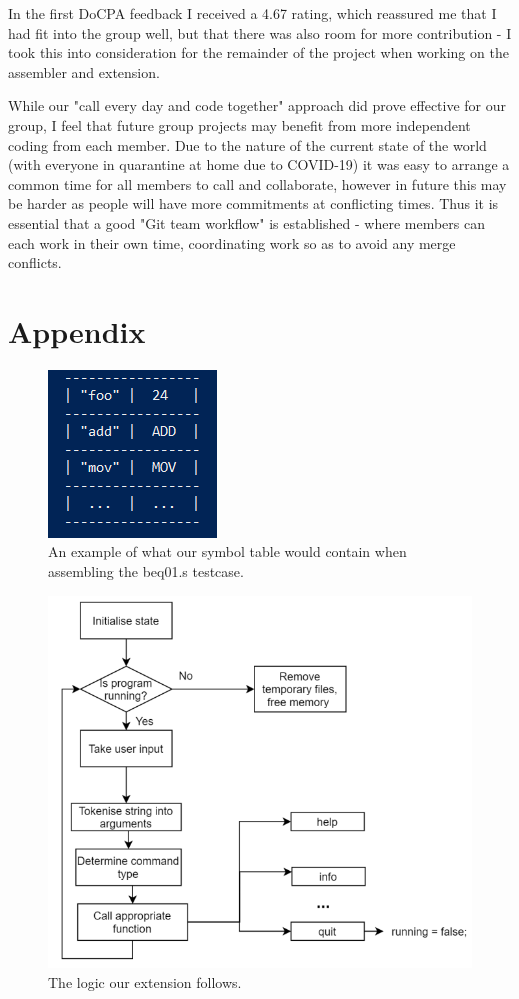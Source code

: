\documentclass[11pt]{article}
\begin{document}
In the first DoCPA feedback I received a 4.67 rating, which reassured me that I had fit into the group well, but that there was also room for more contribution - I took this into consideration for the remainder of the project when working on the assembler and extension. 

While our "call every day and code together" approach did prove effective for our group, I feel that future group projects may benefit from more independent coding from each member. Due to the nature of the current state of the world (with everyone in quarantine at home due to COVID-19) it was easy to arrange a common time for all members to call and collaborate, however in future this may be harder as people will have more commitments at conflicting times. Thus it is essential that a good "Git team workflow" is established - where members can each work in their own time, coordinating work so as to avoid any merge conflicts.
\newpage
\appendix
\section*{Appendix}

\begin{figure}[ht]
    \centering
    \includegraphics[scale = 0.9]{symbolTable.png}
    \caption{An example of what our symbol table would contain when assembling the beq01.s testcase.}
    \label{fig:symboltable}
\end{figure}

\begin{figure}[ht]
    \centering
    \includegraphics[scale = 0.4]{extensionLogic.png}
    \caption{The logic our extension follows.}
    \label{fig:extensionlogic}
\end{figure}
\end{document}
